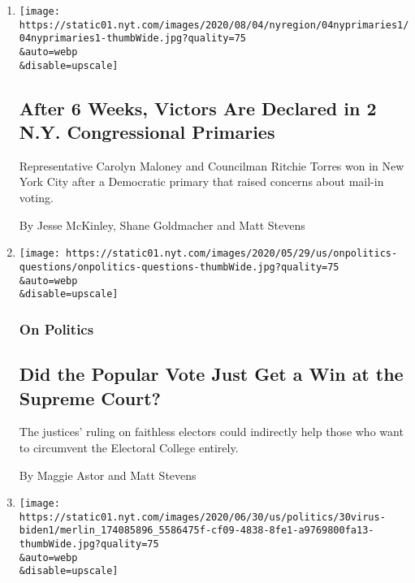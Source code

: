 \begin{enumerate}
\def\labelenumi{\arabic{enumi}.}
\item
  \href{/2020/08/04/nyregion/maloney-torres-ny-congressional-races.html}{}

  \texttt{[image: https://static01.nyt.com/images/2020/08/04/nyregion/04nyprimaries1/04nyprimaries1-thumbWide.jpg?quality=75\\\&auto=webp\\\&disable=upscale]}

  \hypertarget{after-6-weeks-victors-are-declared-in-2-ny-congressional-primaries}{%
  \subsection{After 6 Weeks, Victors Are Declared in 2 N.Y.
  Congressional
  Primaries}\label{after-6-weeks-victors-are-declared-in-2-ny-congressional-primaries}}

  Representative Carolyn Maloney and Councilman Ritchie Torres won in
  New York City after a Democratic primary that raised concerns about
  mail-in voting.

  By Jesse McKinley, Shane Goldmacher and Matt Stevens
\item
  \href{/2020/07/06/us/politics/supreme-court-popular-vote.html}{}

  \texttt{[image: https://static01.nyt.com/images/2020/05/29/us/onpolitics-questions/onpolitics-questions-thumbWide.jpg?quality=75\\\&auto=webp\\\&disable=upscale]}

  \hypertarget{on-politics}{%
  \subsubsection{On Politics}\label{on-politics}}

  \hypertarget{did-the-popular-vote-just-get-a-win-at-the-supreme-court}{%
  \subsection{Did the Popular Vote Just Get a Win at the Supreme
  Court?}\label{did-the-popular-vote-just-get-a-win-at-the-supreme-court}}

  The justices' ruling on faithless electors could indirectly help those
  who want to circumvent the Electoral College entirely.

  By Maggie Astor and Matt Stevens
\item
  \href{/2020/06/30/us/politics/biden-speech-trump-coronavirus.html}{}

  \texttt{[image: https://static01.nyt.com/images/2020/06/30/us/politics/30virus-biden1/merlin\_174085896\_5586475f-cf09-4838-8fe1-a9769800fa13-thumbWide.jpg?quality=75\\\&auto=webp\\\&disable=upscale]}


\end{enumerate}
